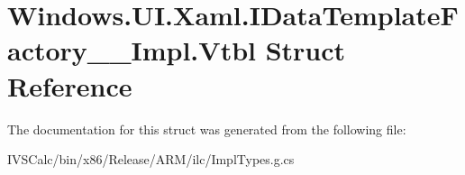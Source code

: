 \hypertarget{struct_windows_1_1_u_i_1_1_xaml_1_1_i_data_template_factory_____impl_1_1_vtbl}{}\section{Windows.\+U\+I.\+Xaml.\+I\+Data\+Template\+Factory\+\_\+\+\_\+\+Impl.\+Vtbl Struct Reference}
\label{struct_windows_1_1_u_i_1_1_xaml_1_1_i_data_template_factory_____impl_1_1_vtbl}


The documentation for this struct was generated from the following file\+:\begin{DoxyCompactItemize}
\item 
I\+V\+S\+Calc/bin/x86/\+Release/\+A\+R\+M/ilc/Impl\+Types.\+g.\+cs\end{DoxyCompactItemize}
